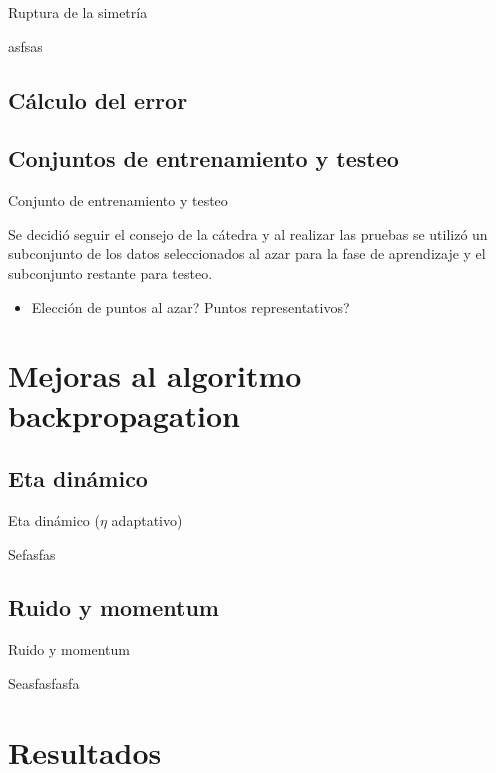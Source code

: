 \documentclass{beamer}
\begin{document}
\begin{frame}{Ruptura de la simetría}
\par asfsas
\end{frame}

\subsection{Cálculo del error}

\subsection{Conjuntos de entrenamiento y testeo}
\begin{frame}{Conjunto de entrenamiento y testeo}
\par Se decidió seguir el consejo de la cátedra y al realizar las pruebas se utilizó un subconjunto de los datos seleccionados al azar para la fase de aprendizaje y el subconjunto restante para testeo.

\begin{itemize}
\item Elección de puntos al azar? Puntos representativos?
\end{itemize}
\end{frame}

\section{Mejoras al algoritmo backpropagation}

\subsection{Eta dinámico}
\begin{frame}{Eta dinámico ($\eta$ adaptativo)}
\par Sefasfas
\end{frame}

\subsection{Ruido y momentum}
\begin{frame}{Ruido y momentum}
\par Seasfasfasfa
\end{frame}

\section{Resultados}
\end{document}
